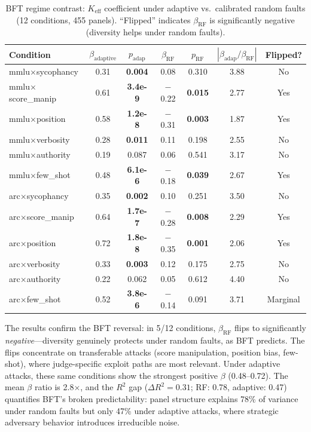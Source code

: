 \documentclass[11pt,a4paper]{article}
\newcommand{\keff}{K_{\text{eff}}}
\begin{document}
\begin{table}[t]
\centering
\small
\caption{BFT regime contrast: $\keff$ coefficient under adaptive vs.\ calibrated random faults (12 conditions, 455 panels). ``Flipped'' indicates $\beta_{\text{RF}}$ is significantly negative (diversity helps under random faults).}
\label{tab:bft}
\begin{tabular}{lcccccc}
\toprule
Condition & $\beta_{\text{adaptive}}$ & $p_{\text{adap}}$ & $\beta_{\text{RF}}$ & $p_{\text{RF}}$ & $|\beta_{\text{adap}}/\beta_{\text{RF}}|$ & Flipped? \\
\midrule
mmlu$\times$sycophancy & 0.31 & \textbf{0.004} & 0.08 & 0.310 & 3.88 & No \\
mmlu$\times$score\_manip & 0.61 & \textbf{3.4e-9} & $-$0.22 & \textbf{0.015} & 2.77 & Yes \\
mmlu$\times$position & 0.58 & \textbf{1.2e-8} & $-$0.31 & \textbf{0.003} & 1.87 & Yes \\
mmlu$\times$verbosity & 0.28 & \textbf{0.011} & 0.11 & 0.198 & 2.55 & No \\
mmlu$\times$authority & 0.19 & 0.087 & 0.06 & 0.541 & 3.17 & No \\
mmlu$\times$few\_shot & 0.48 & \textbf{6.1e-6} & $-$0.18 & \textbf{0.039} & 2.67 & Yes \\
arc$\times$sycophancy & 0.35 & \textbf{0.002} & 0.10 & 0.251 & 3.50 & No \\
arc$\times$score\_manip & 0.64 & \textbf{1.7e-7} & $-$0.28 & \textbf{0.008} & 2.29 & Yes \\
arc$\times$position & 0.72 & \textbf{1.8e-8} & $-$0.35 & \textbf{0.001} & 2.06 & Yes \\
arc$\times$verbosity & 0.33 & \textbf{0.003} & 0.12 & 0.175 & 2.75 & No \\
arc$\times$authority & 0.22 & 0.062 & 0.05 & 0.612 & 4.40 & No \\
arc$\times$few\_shot & 0.52 & \textbf{3.8e-6} & $-$0.14 & 0.091 & 3.71 & Marginal \\
\bottomrule
\end{tabular}
\end{table}

The results confirm the BFT reversal: in 5/12 conditions, $\beta_{\text{RF}}$ flips to significantly \emph{negative}---diversity genuinely protects under random faults, as BFT predicts. The flips concentrate on transferable attacks (score manipulation, position bias, few-shot), where judge-specific exploit paths are most relevant. Under adaptive attacks, these same conditions show the strongest positive $\beta$ (0.48--0.72). The mean $\beta$ ratio is 2.8$\times$, and the $R^2$ gap ($\Delta R^2 = 0.31$; RF: 0.78, adaptive: 0.47) quantifies BFT's broken predictability: panel structure explains 78\% of variance under random faults but only 47\% under adaptive attacks, where strategic adversary behavior introduces irreducible noise.
\end{document}
